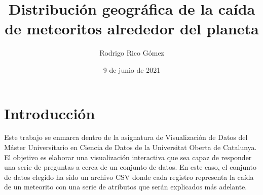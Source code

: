 \documentclass[12pt]{article}
\begin{document}
	\onehalfspacing
	\title{\textbf{Distribución geográfica de la caída de meteoritos alrededor del planeta}}
	\author{Rodrigo Rico Gómez}
	\date{9 de junio de 2021}
	\maketitle
	\section*{Introducción}
	\label{sect:intro}
	Este trabajo se enmarca dentro de la asignatura de Visualización de Datos del Máster Universitario en Ciencia de Datos de la Universitat Oberta de Catalunya. El objetivo es elaborar una visualización interactiva que sea capaz de responder una serie de preguntas a cerca de un conjunto de datos. En este caso, el conjunto de datos elegido ha sido un archivo CSV donde cada registro representa la caída de un meteorito con una serie de atributos que serán explicados más adelante.
\end{document}
